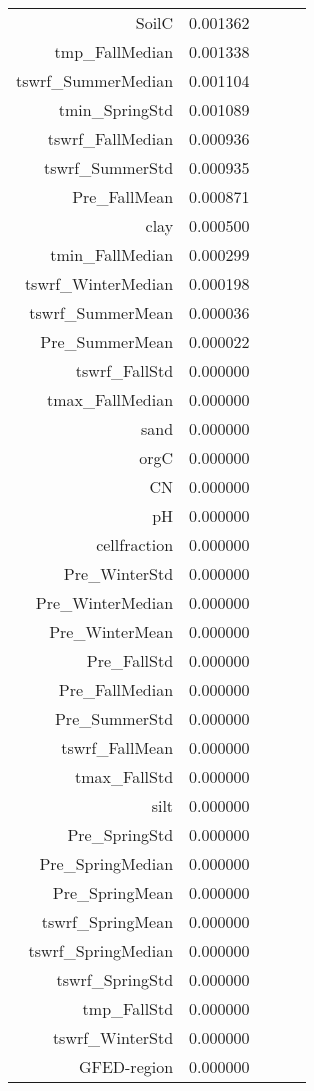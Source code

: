 \begin{tabular}{rrrrr}
SoilC & 0.001362 \\
tmp_FallMedian & 0.001338 \\
tswrf_SummerMedian & 0.001104 \\
tmin_SpringStd & 0.001089 \\
tswrf_FallMedian & 0.000936 \\
tswrf_SummerStd & 0.000935 \\
Pre_FallMean & 0.000871 \\
clay & 0.000500 \\
tmin_FallMedian & 0.000299 \\
tswrf_WinterMedian & 0.000198 \\
tswrf_SummerMean & 0.000036 \\
Pre_SummerMean & 0.000022 \\
tswrf_FallStd & 0.000000 \\
tmax_FallMedian & 0.000000 \\
sand & 0.000000 \\
orgC & 0.000000 \\
CN & 0.000000 \\
pH & 0.000000 \\
cellfraction & 0.000000 \\
Pre_WinterStd & 0.000000 \\
Pre_WinterMedian & 0.000000 \\
Pre_WinterMean & 0.000000 \\
Pre_FallStd & 0.000000 \\
Pre_FallMedian & 0.000000 \\
Pre_SummerStd & 0.000000 \\
tswrf_FallMean & 0.000000 \\
tmax_FallStd & 0.000000 \\
silt & 0.000000 \\
Pre_SpringStd & 0.000000 \\
Pre_SpringMedian & 0.000000 \\
Pre_SpringMean & 0.000000 \\
tswrf_SpringMean & 0.000000 \\
tswrf_SpringMedian & 0.000000 \\
tswrf_SpringStd & 0.000000 \\
tmp_FallStd & 0.000000 \\
tswrf_WinterStd & 0.000000 \\
GFED-region & 0.000000 \\
\bottomrule
\end{tabular}

